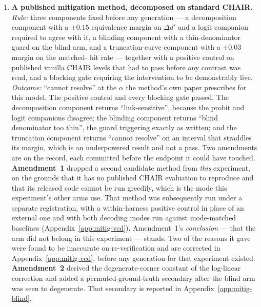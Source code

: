 \begin{enumerate}
\item \textbf{A published mitigation method, decomposed on standard CHAIR.}
\emph{Rule:} three components fixed before any generation --- a decomposition component with a
$\pm 0.15$ equivalence margin on $\Delta d'$ and a logit companion required to agree with it, a
blinding component with a thin-denominator guard on the blind arm, and a truncation-curve component
with a $\pm 0.03$ margin on the matched-\rateF{} hit rate --- together with a positive control on
published vanilla CHAIR levels that had to pass before any contrast was read, and a blocking gate
requiring the intervention to be demonstrably live.
\emph{Outcome:} ``cannot resolve'' at the $\alpha$ the method's own paper prescribes for this
model. The positive control and every blocking gate passed. The decomposition component returns
``link-sensitive'', because the probit and logit companions disagree; the blinding component
returns ``blind denominator too thin'', the guard triggering exactly as written; and the truncation
component returns ``cannot resolve'' on an interval that straddles its margin, which is an
underpowered result and not a pass. Two amendments are on the record, each committed before the
endpoint it could have touched. \textbf{Amendment~1} dropped a second candidate method from
\emph{this} experiment, on the grounds that it has no published CHAIR evaluation to reproduce and that its
released code cannot be run greedily, which is the mode this experiment's other arms use. That method was
subsequently run under a separate registration, with a within-harness positive control in place of an
external one and with both decoding modes run against mode-matched baselines
(Appendix~\ref{app:mitig-vcd}). Amendment~1's \emph{conclusion} --- that the arm did not belong in
this experiment --- stands. Two of the reasons it gave were found to be inaccurate on re-verification and
are corrected in Appendix~\ref{app:mitig-vcd}, before any generation for that experiment existed.
\textbf{Amendment~2}
derived the degenerate-corner constant of the log-linear correction and added a
permuted-ground-truth secondary after the blind arm was seen to degenerate. That secondary
is reported in Appendix~\ref{app:mitig-blind}.


\end{enumerate}
